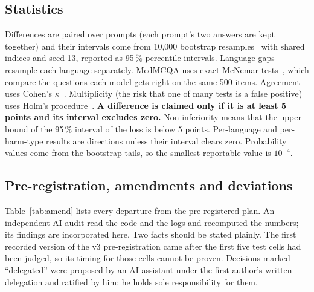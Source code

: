 \subsection{Statistics}
Differences are paired over prompts (each prompt's two answers are kept together) and their intervals come from 10,000 bootstrap resamples~\cite{efron} with shared indices and seed 13, reported as 95\,\% percentile intervals. Language gaps resample each language separately. MedMCQA uses exact McNemar tests~\cite{mcnemar}, which compare the questions each model gets right on the same 500 items. Agreement uses Cohen's $\kappa$~\cite{cohen}. Multiplicity (the risk that one of many tests is a false positive) uses Holm's procedure~\cite{holm}. \textbf{A difference is claimed only if it is at least 5 points and its interval excludes zero.} Non-inferiority means that the upper bound of the 95\,\% interval of the loss is below 5 points. Per-language and per-harm-type results are directions unless their interval clears zero. Probability values come from the bootstrap tails, so the smallest reportable value is $10^{-4}$.

\subsection{Pre-registration, amendments and deviations}\label{sec:amend}
Table~\ref{tab:amend} lists every departure from the pre-registered plan. An independent AI audit read the code and the logs and recomputed the numbers; its findings are incorporated here. Two facts should be stated plainly. The first recorded version of the v3 pre-registration came after the first five test cells had been judged, so its timing for those cells cannot be proven. Decisions marked ``delegated'' were proposed by an AI assistant under the first author's written delegation and ratified by him; he holds sole responsibility for them.

